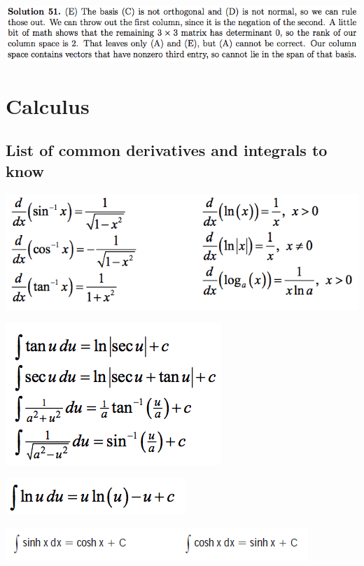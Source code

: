 \documentclass{article}
\begin{document}
\includegraphics[scale=0.65]{1268_51s}

%

\pagebreak

\section{Calculus}

\subsection{List of common derivatives and integrals to know}

\includegraphics[scale=0.45]{derivatives}

\includegraphics[scale=0.45]{integrals}

\includegraphics[scale=0.45]{integral_ln}

\includegraphics[scale=0.65]{integrals2}
\end{document}
